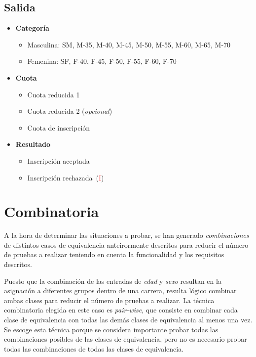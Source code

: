 \subsection{Salida}
\begin{itemize}
	\item \textbf{Categoría}
		\begin{itemize}
			\item Masculina: SM, M-35, M-40, M-45, M-50, M-55, M-60, M-65, M-70
			\item Femenina: SF, F-40, F-45, F-50, F-55, F-60, F-70
		\end{itemize}
	\item \textbf{Cuota}
		\begin{itemize}
			\item Cuota reducida 1
			\item Cuota reducida 2 (\textit{opcional})
			\item Cuota de inscripción
		\end{itemize}
	\item \textbf{Resultado}
		\begin{itemize}
			\item Inscripción aceptada
			\item Inscripción rechazada~(\textcolor{red}{I})
		\end{itemize}
\end{itemize}

\section{Combinatoria}
A la hora de determinar las situaciones a probar, se han generado \textit{combinaciones} de
distintos casos de equivalencia anteirormente descritos para reducir el número de pruebas a
realizar teniendo en cuenta la funcionalidad y los requisitos descritos.

Puesto que la combinación de las entradas de \textit{edad} y \textit{sexo} resultan en la
asignación a diferentes grupos dentro de una carrera, resulta lógico combinar ambas clases
para reducir el número de pruebas a realizar. La técnica combinatoria elegida en este caso
es \textit{pair-wise}, que consiste en combinar cada clase de equivalencia con todas las demás
clases de equivalencia al menos una vez. Se escoge esta técnica porque se considera importante
probar todas las combinaciones posibles de las clases de equivalencia, pero no es necesario
probar todas las combinaciones de todas las clases de equivalencia.

